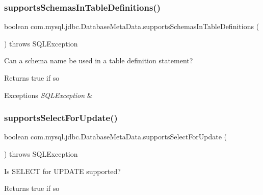 \subsubsection{\texorpdfstring{supports\+Schemas\+In\+Table\+Definitions()}{supportsSchemasInTableDefinitions()}}
{\footnotesize\ttfamily boolean com.\+mysql.\+jdbc.\+Database\+Meta\+Data.\+supports\+Schemas\+In\+Table\+Definitions (\begin{DoxyParamCaption}{ }\end{DoxyParamCaption}) throws S\+Q\+L\+Exception}

Can a schema name be used in a table definition statement?

\begin{DoxyReturn}{Returns}
true if so 
\end{DoxyReturn}

\begin{DoxyExceptions}{Exceptions}
{\em S\+Q\+L\+Exception} & \\
\hline
\end{DoxyExceptions}
\mbox{\label{classcom_1_1mysql_1_1jdbc_1_1_database_meta_data_a5a137a927f36c066955df0d7880a0ea5}} 
\subsubsection{\texorpdfstring{supports\+Select\+For\+Update()}{supportsSelectForUpdate()}}
{\footnotesize\ttfamily boolean com.\+mysql.\+jdbc.\+Database\+Meta\+Data.\+supports\+Select\+For\+Update (\begin{DoxyParamCaption}{ }\end{DoxyParamCaption}) throws S\+Q\+L\+Exception}

Is S\+E\+L\+E\+CT for U\+P\+D\+A\+TE supported?

\begin{DoxyReturn}{Returns}
true if so 
\end{DoxyReturn}

